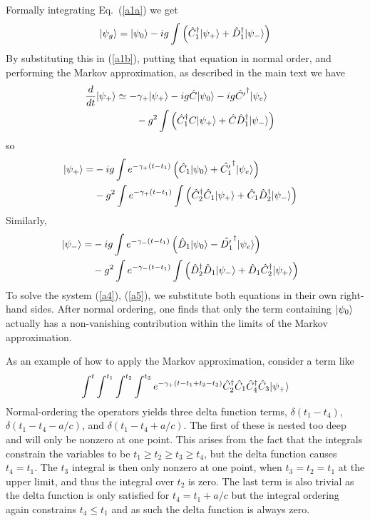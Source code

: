 \documentclass[aps,pra,twocolumn,floatfix,superscriptaddress]{revtex4}
\begin{document}
Formally integrating Eq.~(\ref{a1a}) we get
\begin{equation}
|\psi_g\rangle = |\psi_0\rangle -ig\int\left(\hat C^\dagger_1|\psi_+\rangle + \hat D^\dagger_1|\psi_-\rangle\right)
\label{a2}
\end{equation}
By substituting this in (\ref{a1b}), putting that equation in normal order, and performing the Markov approximation, as described in the main text we have
\begin{align}
\frac{d}{dt}|\psi_{+}\rangle 
&\simeq -\gamma_+ |\psi_+\rangle -ig \hat C |\psi_0\rangle -ig \hat {C^\prime}^\dagger|\psi_{e}\rangle \cr
&\qquad - g^2\int\left(\hat C^\dagger_1 C |\psi_+\rangle + \hat C\hat D^\dagger_1|\psi_-\rangle\right) 
\label{a3}
\end{align}
so
\begin{align}
|\psi_{+}\rangle = &-ig\int e^{-\gamma_+(t-t_1)} \left(\hat C_1 |\psi_0\rangle + \hat {C^\prime_1}^\dagger|\psi_{e}\rangle\right) \cr
& - g^2\int e^{-\gamma_+(t-t_1)}\int\left(\hat C^\dagger_2 \hat C_1 |\psi_+\rangle + \hat C_1\hat D^\dagger_2|\psi_-\rangle\right) \cr
\label{a4}
\end{align}
Similarly,
\begin{align}
|\psi_{-}\rangle = &-ig\int e^{-\gamma_-(t-t_1)} \left(\hat D_1 |\psi_0\rangle - \hat {D^\prime_1}^\dagger|\psi_{e}\rangle\right) \cr
& - g^2\int e^{-\gamma_-(t-t_1)}\int\left(\hat D^\dagger_2 \hat D_1 |\psi_-\rangle + \hat D_1\hat C^\dagger_2|\psi_+\rangle\right) \cr
\label{a5}
\end{align}
To solve the system (\ref{a4}), (\ref{a5}), we substitute both equations in their own right-hand sides.  After normal ordering, one finds that only the term containing $|\psi_0\rangle$ actually has a non-vanishing contribution within the limits of the Markov approximation. 

As an example of how to apply the Markov approximation, consider a term like
\begin{equation}
\int^t\int^{t_1}\int^{t_2}\int^{t_3} e^{-\gamma_+(t-t_1+t_2-t_3)} \hat C^\dagger_2 \hat C_1 \hat C^\dagger_4 \hat C_3 |\psi_+\rangle
\end{equation}
Normal-ordering the operators yields three delta function terms, $\delta(t_1-t_4)$, $\delta(t_1-t_4-a/c)$, and  $\delta(t_1-t_4+a/c)$. The first of these is nested too deep and will only be nonzero at one point. This arises from the fact that the integrals constrain the variables to be $t_1 \geq t_2 \geq t_3 \geq t_4$, but the delta function causes $t_4=t_1$. The $t_3$ integral is then only nonzero at one point, when $t_3=t_2=t_1$ at the upper limit, and thus the integral over $t_2$ is zero. The last term is also trivial as the delta function is only satisfied for $t_4=t_1+a/c$ but the integral ordering again constrains $t_4\leq t_1$ and as such the delta function is always zero. 
\end{document}
